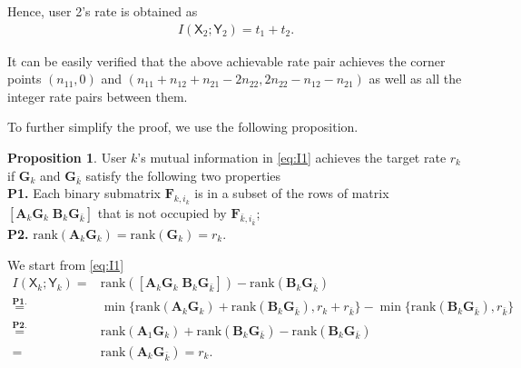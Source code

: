 \documentclass[12pt, draftclsnofoot, onecolumn]{IEEEtran}
\newcommand{\msf}[1]{\mathsf{#1}}
\theoremstyle{definition}
\newtheorem{proposition}{Proposition}
\begin{document}
Hence, user 2's rate is obtained as
\begin{align}
I(\msf{X}_2;\msf{Y}_2) = t_1+t_2.
\end{align}

It can be easily verified that the above achievable rate pair achieves the corner points $(n_{11},0)$ and $(n_{11}+n_{12}+n_{21}-2n_{22},2n_{22} - n_{12}- n_{21} )$ as well as all the integer rate pairs between them.


To further simplify the proof, we use the following proposition.
\begin{proposition}\label{remark:type1}
User $k$'s mutual information in \eqref{eq:I1} achieves the target rate $r_k$ if $\boldsymbol{G}_k$ and $\boldsymbol{G}_{\bar{k}}$ satisfy the following two properties \\
\textbf{P1.} Each binary submatrix $\boldsymbol{F}_{k,i_k}$ is in a subset of the rows of matrix $[\boldsymbol{A}_k\boldsymbol{G}_k \; \boldsymbol{B}_k\boldsymbol{G}_{\bar{k}}]$ that is not occupied by $\boldsymbol{F}_{\bar{k},i_{\bar{k}}}$; \\
\textbf{P2.} $\text{rank}(\boldsymbol{A}_k\boldsymbol{G}_k) =\text{rank}(\boldsymbol{G}_k)= r_k$.
\end{proposition}
\begin{IEEEproof}
We start from \eqref{eq:I1}
\begin{align}\label{eq:I1_sim_type1}
I(\msf{X}_k;\msf{Y}_k)=&\text{rank}([\boldsymbol{A}_k\boldsymbol{G}_k \; \boldsymbol{B}_k\boldsymbol{G}_{\bar{k}}]) - \text{rank}(\boldsymbol{B}_k\boldsymbol{G}_{\bar{k}}) \nonumber \\
\overset{\textbf{P1.}}{=}&\min\{\text{rank}(\boldsymbol{A}_k\boldsymbol{G}_k)+\text{rank}(\boldsymbol{B}_k\boldsymbol{G}_{\bar{k}}),r_k+r_{\bar{k}}\} %
-\min\{\text{rank}(\boldsymbol{B}_k\boldsymbol{G}_{\bar{k}}),r_{\bar{k}}\} \nonumber \\
\overset{\textbf{P2.}}{=}&\text{rank}(\boldsymbol{A}_1\boldsymbol{G}_k)+\text{rank}(\boldsymbol{B}_k\boldsymbol{G}_{\bar{k}})
-\text{rank}(\boldsymbol{B}_k\boldsymbol{G}_{\bar{k}})  \nonumber  \\
=&\text{rank}(\boldsymbol{A}_k\boldsymbol{G}_{\bar{k}})= r_k.
\end{align}
\end{IEEEproof}
\end{document}

